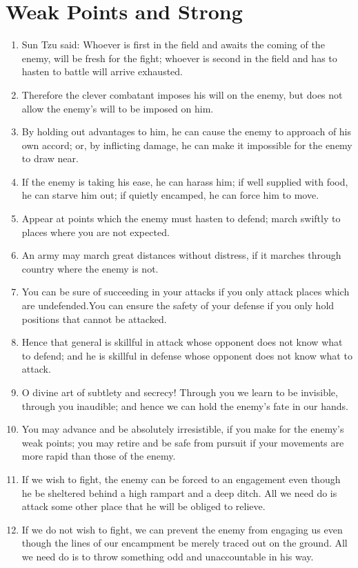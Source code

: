 \documentclass[oneside]{book}
\begin{document}
\chapter{Weak Points and Strong}
\begin{enumerate}
	\item Sun Tzu said: Whoever is first in the field and awaits the coming of the enemy, will be fresh for the fight; whoever is second in the field and has to hasten to battle will arrive exhausted.
	\item Therefore the clever combatant imposes his will on the enemy, but does not allow the enemy's will to be imposed on him.
	\item By holding out advantages to him, he can cause the enemy to approach of his own accord; or, by inflicting damage, he can make it impossible for the enemy to draw near.
	\item If the enemy is taking his ease, he can harass him; if well supplied with food, he can starve him out; if quietly encamped, he can force him to move.
	\item Appear at points which the enemy must hasten to defend; march swiftly to places where you are not expected.
	\item An army may march great distances without distress, if it marches through country where the enemy is not.
	\item You can be sure of succeeding in your attacks if you only attack places which are undefended.You can ensure the safety of your defense if you only hold positions that cannot be attacked.
	\item Hence that general is skillful in attack whose opponent does not know what to defend; and he is skillful in defense whose opponent does not know what to attack.
	\item O divine art of subtlety and secrecy! Through you we learn to be invisible, through you inaudible; and hence we can hold the enemy's fate in our hands.
	\item You may advance and be absolutely irresistible, if you make for the enemy's weak points; you may retire and be safe from pursuit if your movements are more rapid than those of the enemy.
	\item If we wish to fight, the enemy can be forced to an engagement even though he be sheltered behind a high rampart and a deep ditch. All we need do is attack some other place that he will be obliged to relieve.
	\item If we do not wish to fight, we can prevent the enemy from engaging us even though the lines of our encampment be merely traced out on the ground. All we need do is to throw something odd and unaccountable in his way.

\end{enumerate}
\end{document}
